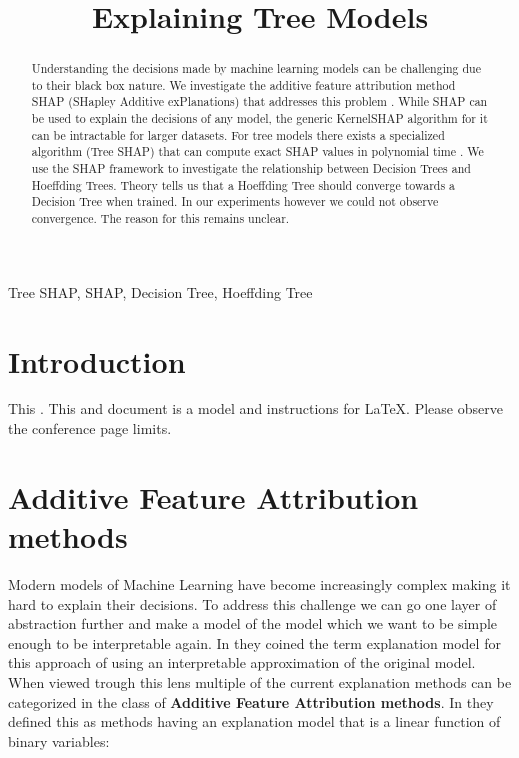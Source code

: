 \documentclass[conference]{IEEEtran}
\begin{document}
\title{Explaining Tree Models}

\author{
}

\maketitle

\begin{abstract}
Understanding the decisions made by machine learning models can be challenging due to their black box nature.
We investigate the additive feature attribution method SHAP (SHapley Additive exPlanations) that addresses this problem \cite{b2}. 
While SHAP can be used to explain the decisions of any model, the generic KernelSHAP algorithm for it can be intractable for larger datasets. 
For tree models there exists a specialized algorithm (Tree SHAP) that can compute exact SHAP values in polynomial time \cite{b1}. 
We use the SHAP framework to investigate the relationship between Decision Trees and Hoeffding Trees\cite{b3}. 
Theory tells us that a Hoeffding Tree should converge towards a Decision Tree when trained. 
In our experiments however we could not observe convergence. 
The reason for this remains unclear.
\end{abstract}

\begin{IEEEkeywords}
Tree SHAP, SHAP, Decision Tree, Hoeffding Tree
\end{IEEEkeywords}

\section{Introduction}
This . This  and \cite{b3} document is a model and instructions for \LaTeX.
Please observe the conference page limits. 

\section{Additive Feature Attribution methods}
Modern models of Machine Learning have become increasingly complex making it hard to explain their decisions.
To address this challenge we can go one layer of abstraction further and make a model of the model which we want to be simple enough to be interpretable again.
In \cite{b2} they coined the term explanation model for this approach of using an interpretable approximation of the original model.\\
When viewed trough this lens multiple of the current explanation methods can be categorized in the class of  \textbf{Additive Feature Attribution methods}. In \cite{b2} they defined this as methods having an explanation model that is a linear function of binary variables:\\
\end{document}
